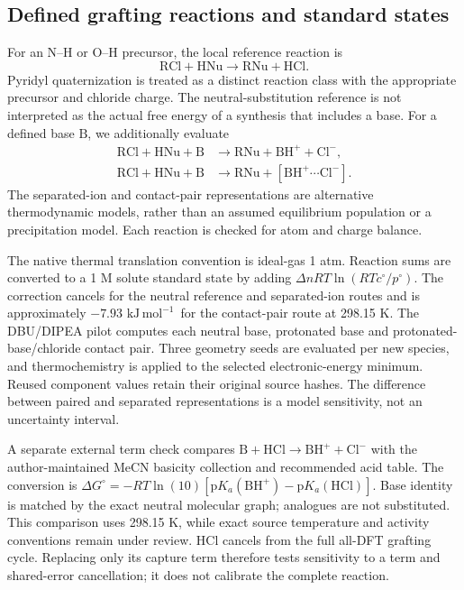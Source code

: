 \documentclass[11pt]{article}
\newcommand{\kj}{\ensuremath{\mathrm{kJ\,mol^{-1}}}}
\begin{document}
\subsection{Defined grafting reactions and standard states}
For an N--H or O--H precursor, the local reference reaction is
\begin{equation}
\mathrm{RCl + HNu \rightarrow RNu + HCl}.
\end{equation}
Pyridyl quaternization is treated as a distinct reaction class with the appropriate precursor and chloride charge. The neutral-substitution reference is not interpreted as the actual free energy of a synthesis that includes a base. For a defined base $\mathrm{B}$, we additionally evaluate
\begin{align}
\mathrm{RCl + HNu + B} &\mathrm{\rightarrow RNu + BH^+ + Cl^-},\\
\mathrm{RCl + HNu + B} &\mathrm{\rightarrow RNu + [BH^+\cdots Cl^-]}.
\end{align}
The separated-ion and contact-pair representations are alternative thermodynamic models, rather than an assumed equilibrium population or a precipitation model. Each reaction is checked for atom and charge balance.

The native thermal translation convention is ideal-gas 1 atm. Reaction sums are converted to a 1 M solute standard state by adding $\Delta nRT\ln(RTc^\circ/p^\circ)$. The correction cancels for the neutral reference and separated-ion routes and is approximately $-7.93$ \kj\ for the contact-pair route at 298.15 K. The DBU/DIPEA pilot computes each neutral base, protonated base and protonated-base/chloride contact pair. Three geometry seeds are evaluated per new species, and thermochemistry is applied to the selected electronic-energy minimum. Reused component values retain their original source hashes. The difference between paired and separated representations is a model sensitivity, not an uncertainty interval.

A separate external term check compares $\mathrm{B+HCl\rightarrow BH^++Cl^-}$ with the author-maintained MeCN basicity collection and recommended acid table.\cite{basicity2019,acidity2013,pkaTables} The conversion is $\Delta G^\circ=-RT\ln(10)[\mathrm{p}K_a(\mathrm{BH^+})-\mathrm{p}K_a(\mathrm{HCl})]$. Base identity is matched by the exact neutral molecular graph; analogues are not substituted. This comparison uses 298.15 K, while exact source temperature and activity conventions remain under review. HCl cancels from the full all-DFT grafting cycle. Replacing only its capture term therefore tests sensitivity to a term and shared-error cancellation; it does not calibrate the complete reaction.
\end{document}
